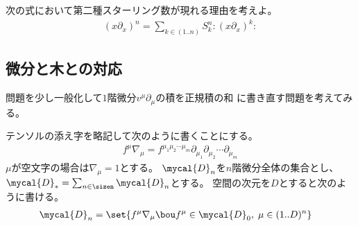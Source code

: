 \begin{todo}[正規積とスターリング数]\label{todo:正規積とスターリング数} %
	次の式において第二種スターリング数が現れる理由を考えよ。
	\begin{equation*}\begin{split} %
		(x\partial_x)^n = \sum_{k\in(1..n)}S_k^n:(x\partial_x)^k:
	\end{split}\end{equation*} %
\end{todo} %

\subsection{微分と木との対応}\label{s2:微分と木との対応} %
問題を少し一般化して$1$階微分$v^\mu\partial_\mu$の積を正規積の和
に書き直す問題を考えてみる。

テンソルの添え字を略記して次のように書くことにする。
\begin{equation*}\begin{split} %
	f^\mu\nabla_\mu = f^{\mu_1\mu_2\cdots\mu_m}
		\partial_{\mu_1}\partial_{\mu_2}\cdots\partial_{\mu_m}
\end{split}\end{equation*} %
$\mu$が空文字の場合は$\nabla_\mu=1$とする。
$\mycal{D}_n$を$n$階微分全体の集合とし、
$\mycal{D}_*=\sum_{n\in\sizen}\mycal{D}_n$とする。
空間の次元を$D$とすると次のように書ける。
\begin{equation*}\begin{split} %
	\mycal{D}_n &= \set{f^\mu\nabla_\mu \bou f^\mu\in\mycal{D}_0
		,\;\mu\in(1..D)^n}
\end{split}\end{equation*} %

